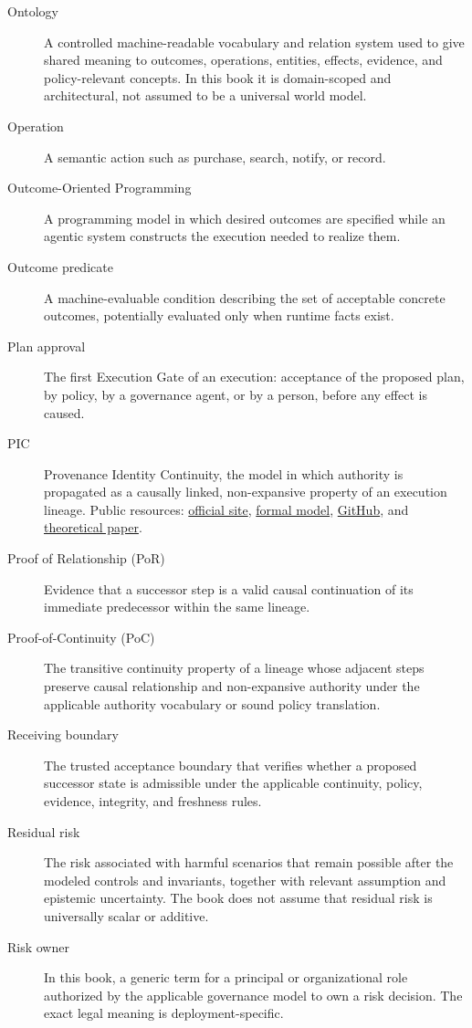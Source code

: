 \documentclass[10pt,oneside,openany]{book}
\begin{document}
\begin{description}
\item[Ontology] A controlled machine-readable vocabulary and relation system used to give shared meaning to outcomes, operations, entities, effects, evidence, and policy-relevant concepts. In this book it is domain-scoped and architectural, not assumed to be a universal world model.
\item[Operation] A semantic action such as purchase, search, notify, or record.
\item[Outcome-Oriented Programming] A programming model in which desired outcomes are specified while an agentic system constructs the execution needed to realize them.
\item[Outcome predicate] A machine-evaluable condition describing the set of acceptable concrete outcomes, potentially evaluated only when runtime facts exist.
\item[Plan approval] The first Execution Gate of an execution: acceptance of the proposed plan, by policy, by a governance agent, or by a person, before any effect is caused.
\item[PIC] Provenance Identity Continuity, the model in which authority is propagated as a causally linked, non-expansive property of an execution lineage. Public resources: \href{https://www.pic-protocol.org}{official site}, \href{https://www.pic-protocol.org/formal-model}{formal model}, \href{https://github.com/pic-protocol}{GitHub}, and \href{https://arxiv.org/abs/2607.08906}{theoretical paper}.
\item[Proof of Relationship (PoR)] Evidence that a successor step is a valid causal continuation of its immediate predecessor within the same lineage.
\item[Proof-of-Continuity (PoC)] The transitive continuity property of a lineage whose adjacent steps preserve causal relationship and non-expansive authority under the applicable authority vocabulary or sound policy translation.
\item[Receiving boundary] The trusted acceptance boundary that verifies whether a proposed successor state is admissible under the applicable continuity, policy, evidence, integrity, and freshness rules.
\item[Residual risk] The risk associated with harmful scenarios that remain possible after the modeled controls and invariants, together with relevant assumption and epistemic uncertainty. The book does not assume that residual risk is universally scalar or additive.
\item[Risk owner] In this book, a generic term for a principal or organizational role authorized by the applicable governance model to own a risk decision. The exact legal meaning is deployment-specific.

\end{description}
\end{document}
